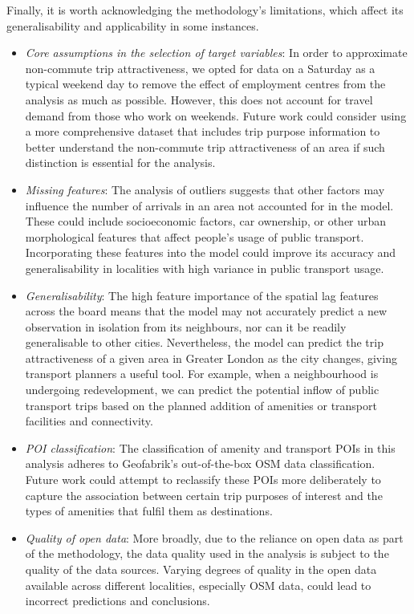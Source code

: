 \pagebreak
Finally, it is worth acknowledging the methodology's limitations, which affect its generalisability and applicability in some instances.

\begin{itemize}
    \setlength\itemsep{0em}
    \item \textit{Core assumptions in the selection of target variables}: In order to approximate non-commute trip attractiveness, we opted for data on a Saturday as a typical weekend day to remove the effect of employment centres from the analysis as much as possible. However, this does not account for travel demand from those who work on weekends. Future work could consider using a more comprehensive dataset that includes trip purpose information to better understand the non-commute trip attractiveness of an area if such distinction is essential for the analysis. 
    \item \textit{Missing features}: The analysis of outliers suggests that other factors may influence the number of arrivals in an area not accounted for in the model. These could include socioeconomic factors, car ownership, or other urban morphological features that affect people's usage of public transport. Incorporating these features into the model could improve its accuracy and generalisability in localities with high variance in public transport usage.
    \item \textit{Generalisability}: The high feature importance of the spatial lag features across the board means that the model may not accurately predict a new observation in isolation from its neighbours, nor can it be readily generalisable to other cities. Nevertheless, the model can predict the trip attractiveness of a given area in Greater London as the city changes, giving transport planners a useful tool. For example, when a neighbourhood is undergoing redevelopment, we can predict the potential inflow of public transport trips based on the planned addition of amenities or transport facilities and connectivity.
    \item \textit{POI classification}: The classification of amenity and transport POIs in this analysis adheres to Geofabrik's out-of-the-box OSM data classification. Future work could attempt to reclassify these POIs more deliberately to capture the association between certain trip purposes of interest and the types of amenities that fulfil them as destinations.
    \item \textit{Quality of open data}: More broadly, due to the reliance on open data as part of the methodology, the data quality used in the analysis is subject to the quality of the data sources. Varying degrees of quality in the open data available across different localities, especially OSM data, could lead to incorrect predictions and conclusions. 
\end{itemize}

